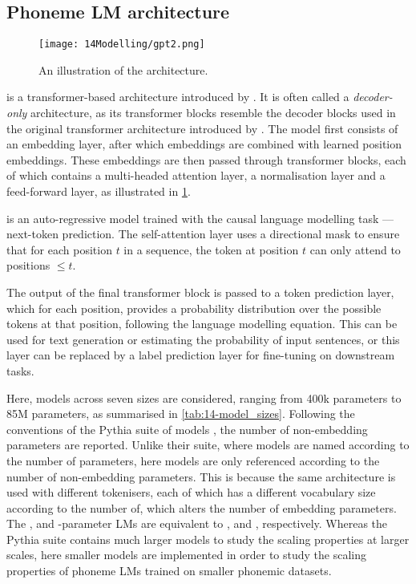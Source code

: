 \subsection{Phoneme LM architecture}\label{sec:14-phonemearchitecture}

\begin{figure}[t]
    \centering
    \texttt{[image: 14Modelling/gpt2.png]}
    \caption{An illustration of the \gpt architecture.}
    \label{fig:14-gpt2}
\end{figure}

\gpt is a transformer-based architecture introduced by \citet{radford-2019-gpt2}. It is often called a \emph{decoder-only} architecture, as its transformer blocks resemble the decoder blocks used in the original transformer architecture introduced by \citet{vaswani2017attention}. The model first consists of an embedding layer, after which embeddings are combined with learned position embeddings. These embeddings are then passed through transformer blocks, each of which contains a multi-headed attention layer, a normalisation layer and a feed-forward layer, as illustrated in \cref{fig:14-gpt2}.

\gpt is an auto-regressive model trained with the causal language modelling task --- next-token prediction. The self-attention layer uses a directional mask to ensure that for each position $t$ in a sequence, the token at position $t$ can only attend to positions $\leq t$.  

The output of the final transformer block is passed to a token prediction layer, which for each position, provides a probability distribution over the possible tokens at that position, following the language modelling equation. This can be used for text generation or estimating the probability of input sentences, or this layer can be replaced by a label prediction layer for fine-tuning on downstream tasks.

Here, \gpt models across seven sizes are considered, ranging from 400k parameters to 85M parameters, as summarised in \cref{tab:14-model_sizes}. Following the conventions of the Pythia suite of models \citep{biderman2023pythia}, the number of non-embedding parameters are reported. Unlike their suite, where models are named according to the number of parameters, here models are only referenced according to the number of non-embedding parameters. This is because the same architecture is used with different tokenisers, each of which has a different vocabulary size according to the number of, which alters the number of embedding parameters. The ,  and -parameter LMs are equivalent to ,  and , respectively. Whereas the Pythia suite contains much larger models to study the scaling properties at larger scales, here smaller models are implemented in order to study the scaling properties of phoneme LMs trained on smaller phonemic datasets.

